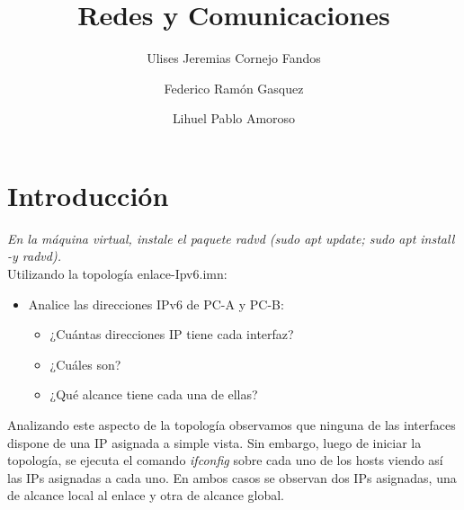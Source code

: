 \documentclass[osajnl,twocolumn,showpacs,superscriptaddress,10pt]{revtex4-1} %
\begin{document}
\title{Redes y Comunicaciones}

\author{Ulises Jeremias Cornejo Fandos}

\author{Federico Ramón Gasquez}

\author{Lihuel Pablo Amoroso}


\maketitle %

\onecolumngrid

\section{Introducción}

\textit{En la máquina virtual, instale el paquete radvd (sudo apt update; sudo apt install -y radvd).} \\

Utilizando la topología enlace-Ipv6.imn:

\begin{itemize}
    \item Analice las direcciones IPv6 de PC-A y PC-B:
    
    \begin{itemize}
        \item ¿Cuántas direcciones IP tiene cada interfaz?
        \item ¿Cuáles son?
        \item ¿Qué alcance tiene cada una de ellas?
    \end{itemize}
\end{itemize}

Analizando este aspecto de la topología observamos que ninguna de las interfaces
dispone de una IP asignada a simple vista. Sin embargo, luego de iniciar la topología,
se ejecuta el comando \textit{ifconfig} sobre cada uno de los hosts
viendo así las IPs asignadas a cada uno. En ambos casos se observan dos IPs asignadas, una de alcance local al enlace y otra de alcance global. \\
\end{document}
